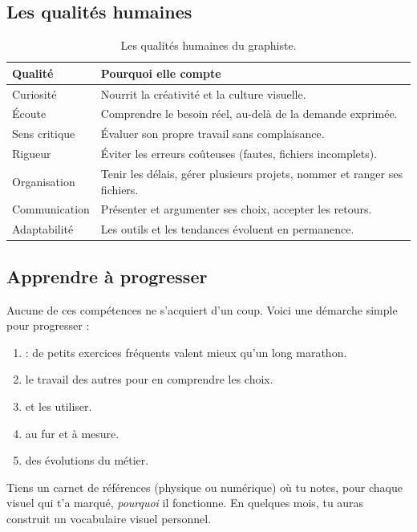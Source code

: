 \subsection{Les qualités humaines}

\begin{table}[h!]
\centering
\begin{tabular}{@{}p{3.6cm}p{10.4cm}@{}}
\toprule
\textbf{Qualité} & \textbf{Pourquoi elle compte} \\
\midrule
Curiosité & Nourrit la créativité et la culture visuelle. \\
Écoute & Comprendre le besoin réel, au-delà de la demande exprimée. \\
Sens critique & Évaluer son propre travail sans complaisance. \\
Rigueur & Éviter les erreurs coûteuses (fautes, fichiers incomplets). \\
Organisation & Tenir les délais, gérer plusieurs projets, nommer et ranger ses fichiers. \\
Communication & Présenter et argumenter ses choix, accepter les retours. \\
Adaptabilité & Les outils et les tendances évoluent en permanence. \\
\bottomrule
\end{tabular}
\caption{Les qualités humaines du graphiste.}
\end{table}

\subsection{Apprendre à progresser}

Aucune de ces compétences ne s'acquiert d'un coup. Voici une démarche simple pour progresser :

\begin{enumerate}
    \item {} : de petits exercices fréquents valent mieux qu'un long marathon.
    \item {} le travail des autres pour en comprendre les choix.
    \item {} et les utiliser.
    \item {} au fur et à mesure.
    \item {} des évolutions du métier.
\end{enumerate}

\begin{astuce}
Tiens un carnet de références (physique ou numérique) où tu notes, pour chaque visuel qui t'a marqué, \emph{pourquoi} il fonctionne. En quelques mois, tu auras construit un vocabulaire visuel personnel.
\end{astuce}


